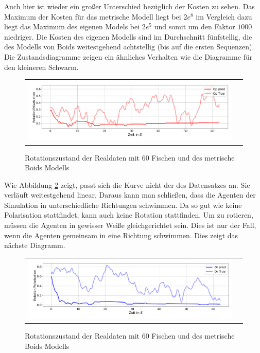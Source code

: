 Auch hier ist wieder ein großer Unterschied bezüglich der Kosten zu sehen. Das Maximum der Kosten für das metrische Modell liegt bei $2e^{8}$ im Vergleich dazu liegt das Maximum des eigenen Models bei $2e^{5}$ und somit um den Faktor $1000$ niedriger. Die Kosten des eigenen Modells sind im Durchschnitt fünfstellig, die des Modells von Boids weitestgehend achtstellig (bis auf die ersten Sequenzen). Die Zustandsdiagramme zeigen ein ähnliches Verhalten wie die Diagramme für den kleineren Schwarm.

\begin{figure}[H]
\centering
\begin{tabular}{cc}
\includegraphics[width=1.0\textwidth]{figures/Experimente/Realdaten/Boids_60F_zust_Pol.png} 
\end{tabular}
\caption{Rotationszustand der Realdaten mit 60 Fischen und des metrische Boids Modells\label{fig:60Fisch_pol_boids}}
\end{figure}

Wie Abbildung \ref{fig:60Fisch_rot_boids} zeigt, passt sich die Kurve nicht der des Datensatzes an. Sie verläuft weitestgehend linear. Daraus kann man schließen, dass die Agenten der Simulation in unterschiedliche Richtungen schwimmen. Da so gut wie keine Polarisation stattfindet, kann auch keine Rotation stattfinden. Um zu rotieren, müssen die Agenten in gewisser Weiße gleichgerichtet sein. Dies ist nur der Fall, wenn die Agenten gemeinsam in eine Richtung schwimmen. Dies zeigt das nächste Diagramm.

\begin{figure}[H]
\centering
\begin{tabular}{cc}
\includegraphics[width=1.0\textwidth]{figures/Experimente/Realdaten/Boids_60F_zust_Rot.png} 
\end{tabular}
\caption{Rotationszustand der Realdaten mit 60 Fischen und des metrische Boids Modells\label{fig:60Fisch_rot_boids}}
\end{figure}

